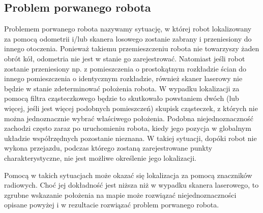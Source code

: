 \subsection{Problem porwanego robota}
Problemem porwanego robota nazywamy sytuację, w której robot lokalizowany za pomocą odometrii i/lub skanera losowego zostanie zabrany i przeniesiony do innego otoczenia. Ponieważ takiemu przemieszczeniu robota nie towarzyszy żaden obrót kół, odometria nie jest w stanie go zarejestrować. Natomiast jeśli robot zostanie przeniesiony np. z pomieszczenia o prostokątnym rozkładzie ścian do innego pomieszczenia o identycznym rozkładzie, również skaner laserowy nie będzie w stanie zdeterminować położenia robota. W wypadku lokalizacji za pomocą filtra cząsteczkowego będzie to skutkowało powstaniem dwóch (lub więcej, jeśli jest więcej podobnych pomieszczeń) skupisk cząsteczek, z których nie można jednoznacznie wybrać właściwego położenia. Podobna niejednoznaczność zachodzi często zaraz po uruchomieniu robota, kiedy jego pozycja w globalnym układzie współrzędnych pozostanie nieznana. W takiej sytuacji, dopóki robot nie wykona przejazdu, podczas którego zostaną zarejestrowane punkty charakterystyczne, nie jest możliwe określenie jego lokalizacji. 

Pomocą w takich sytuacjach może okazać się lokalizacja za pomocą znaczników radiowych. Choć jej dokładność jest niższa niż w wypadku skanera laserowego, to zgrubne wskazanie położenia na mapie może rozwiązać niejednoznaczności opisane powyżej i w rezultacie rozwiązać problem porwanego robota. 